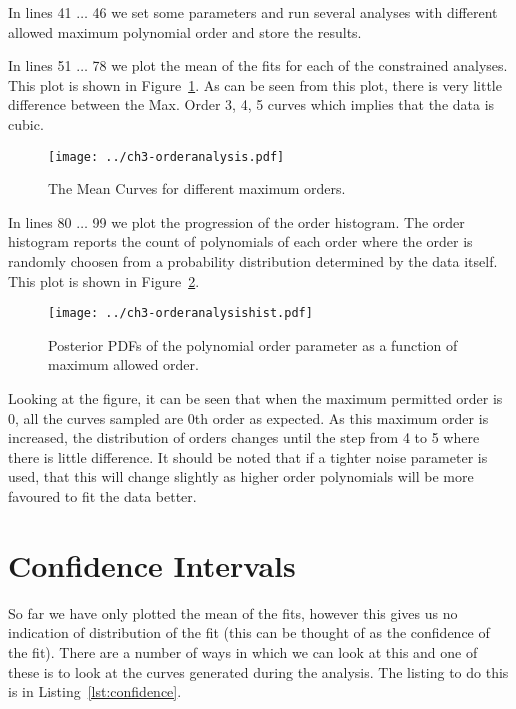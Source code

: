 \documentclass{tufte-handout}
\begin{document}
In lines 41 $\ldots$ 46 we set some parameters and run several
analyses with different allowed maximum polynomial order and store
the results.

In lines 51 $\ldots$ 78 we plot the mean of the fits for each of the
constrained analyses. This plot is shown in
Figure~\ref{fig:orderanalysis}.  As can be seen from this plot, there
is very little difference between the Max. Order 3, 4, 5 curves which
implies that the data is cubic.

\begin{figure}
\texttt{[image: ../ch3-orderanalysis.pdf]}
\caption{The Mean Curves for different maximum orders.}
\label{fig:orderanalysis}
\end{figure}

In lines 80 $\ldots$ 99 we plot the progression of the order 
histogram. The order histogram reports the count of polynomials
of each order where the order is randomly choosen from a 
probability distribution determined by the data itself. This 
plot is shown in Figure~\ref{fig:orderanalysishist}.

\begin{figure}
\texttt{[image: ../ch3-orderanalysishist.pdf]}
\caption{Posterior PDFs of the polynomial order parameter as a function of maximum allowed order.}
\label{fig:orderanalysishist}
\end{figure}

Looking at the figure, it can be seen that when the maximum permitted
order is 0, all the curves sampled are 0th order as expected. As this
maximum order is increased, the distribution of orders changes until
the step from 4 to 5 where there is little difference. It should be
noted that if a tighter noise parameter is used, that this will change
slightly as higher order polynomials will be more favoured to fit the
data better.

\section{Confidence Intervals}

So far we have only plotted the mean of the fits, however this gives
us no indication of distribution of the fit (this can be thought of as
the confidence of the fit). There are a number of ways in which we can
look at this and one of these is to look at the curves generated
during the analysis. The listing to do this is in
Listing~\ref{lst:confidence}.

\lstset{caption=Confidence Intervals., label=lst:confidence} 

\end{document}
